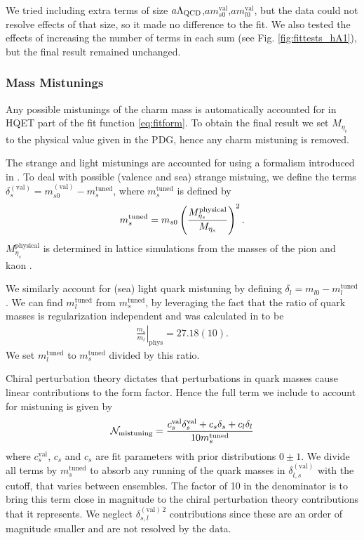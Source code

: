 We tried including extra terms of size $a\Lambda_{\text{QCD}}$,$am^{\text{val}}_{s0}$,$am^{\text{val}}_{l0}$, but the data could not resolve effects of that size, so it made no difference to the fit. We also tested the effects of increasing the number of terms in each sum (see Fig. \ref{fig:fittests_hA1}), but the final result remained unchanged.

\subsubsection{Mass Mistunings}

Any possible mistunings of the charm mass is automatically accounted for in HQET part of the fit function \eqref{eq:fitform}. To obtain the final result we set $M_{\eta_c}$ to the physical value given in the PDG, hence any charm mistuning is removed.

The strange and light mistunings are accounted for using a formalism introduced in \cite{Chakraborty:2014aca}. To deal with possible (valence and sea) strange mistuing, we define the terms $\delta^{(\text{val})}_s = m^{(\text{val})}_{s0}- m_s^{\text{tuned}}$, where $m_s^{\text{tuned}}$ is defined by
\begin{align}
  m_s^{\text{tuned}} = m_{s0} \left({ M^{\text{physical}}_{\eta_s} \over M_{\eta_s} }\right)^2.
\end{align}
$M_{\eta_s}^{\text{physical}}$ is determined in lattice simulations from the masses of the pion and kaon \cite{Dowdall:2013rya}.

We similarly account for (sea) light quark mistuning by defining $\delta_l = m_{l0} - m_l^{\text{tuned}}$. We can find $m_l^{\text{tuned}}$ from $m_s^{\text{tuned}}$, by leveraging the fact that the ratio of quark masses is regularization independent and was calculated in \cite{Bazavov:2017lyh} to be
\begin{align}
  \left.\frac{m_s}{m_l}\right\rvert_{\textrm{phys}} = 27.18(10).
\end{align}
We set $m_l^{\text{tuned}}$ to $m_s^{\text{tuned}}$ divided by this ratio.

Chiral perturbation theory dictates that perturbations in quark masses cause linear contributions to the form factor. Hence the full term we include to account for mistuning is given by
\begin{align}
  \mathcal{N}_{\text{mistuning}} = {c^{\text{val}}_s \delta^{\text{val}}_s + c_s \delta_s + c_l \delta_l \over 10 m_s^{\text{tuned}}}
  \label{eq:mistuning_BsDsstar}
\end{align}
where $c_s^{\text{val}}$, $c_s$ and $c_s$ are fit parameters with prior distributions $0\pm 1$. We divide all terms by $m_s^{\text{tuned}}$ to absorb any running of the quark masses in $\delta_{l,s}^{(\text{val})}$ with the cutoff, that varies between ensembles. The factor of 10 in the denominator is to bring this term close in magnitude to the chiral perturbation theory contributions that it represents. We neglect $\delta^{(\text{val})\,2}_{s,l}$ contributions since these are an order of magnitude smaller and are not resolved by the data.

